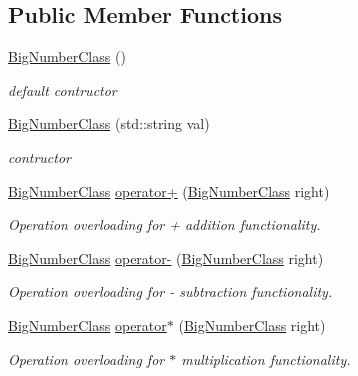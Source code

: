 \subsection*{Public Member Functions}
\begin{DoxyCompactItemize}
\item 
\mbox{\hyperlink{class_big_numbers_namespace_1_1_big_number_class_ac8f36551cb74f6164964a761f552f8ad}{Big\+Number\+Class}} ()
\begin{DoxyCompactList}\small\item\em default contructor \end{DoxyCompactList}\item 
\mbox{\hyperlink{class_big_numbers_namespace_1_1_big_number_class_a12f6b5475ccbb653a84908ebc1bd1ed2}{Big\+Number\+Class}} (std\+::string val)
\begin{DoxyCompactList}\small\item\em contructor \end{DoxyCompactList}\item 
\mbox{\hyperlink{class_big_numbers_namespace_1_1_big_number_class}{Big\+Number\+Class}} \mbox{\hyperlink{class_big_numbers_namespace_1_1_big_number_class_aa63331a696556f4d0e3728515cecd166}{operator+}} (\mbox{\hyperlink{class_big_numbers_namespace_1_1_big_number_class}{Big\+Number\+Class}} right)
\begin{DoxyCompactList}\small\item\em Operation overloading for + addition functionality. \end{DoxyCompactList}\item 
\mbox{\hyperlink{class_big_numbers_namespace_1_1_big_number_class}{Big\+Number\+Class}} \mbox{\hyperlink{class_big_numbers_namespace_1_1_big_number_class_a2355731c0d1f103bd68f1e4ff14bc6f4}{operator-\/}} (\mbox{\hyperlink{class_big_numbers_namespace_1_1_big_number_class}{Big\+Number\+Class}} right)
\begin{DoxyCompactList}\small\item\em Operation overloading for -\/ subtraction functionality. \end{DoxyCompactList}\item 
\mbox{\hyperlink{class_big_numbers_namespace_1_1_big_number_class}{Big\+Number\+Class}} \mbox{\hyperlink{class_big_numbers_namespace_1_1_big_number_class_a07bfcd8a84f38414dc8abc614107824f}{operator$\ast$}} (\mbox{\hyperlink{class_big_numbers_namespace_1_1_big_number_class}{Big\+Number\+Class}} right)
\begin{DoxyCompactList}\small\item\em Operation overloading for $\ast$ multiplication functionality. \end{DoxyCompactList}\item 

\end{DoxyCompactItemize}
